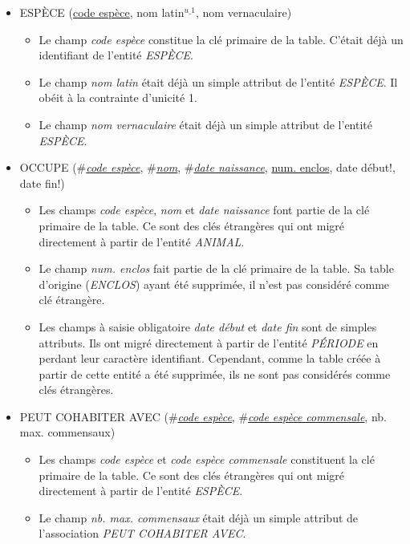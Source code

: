 \documentclass[a4paper]{article}
\newcommand{\relat}[1]{\textsc{#1}}
\newcommand{\attr}[1]{#1}
\newcommand{\prim}[1]{\uline{#1}}
\newcommand{\foreign}[1]{\#\textsl{#1}}
\begin{document}
\begin{itemize}
  \item \relat{ESPÈCE} (\prim{code espèce}, \attr{nom latin}$^{u\_1}$, \attr{nom vernaculaire})
  \begin{itemize}
    \item Le champ \emph{code espèce} constitue la clé primaire de la table. C'était déjà un identifiant de l'entité \emph{ESPÈCE}.
    \item Le champ \emph{nom latin} était déjà un simple attribut de l'entité \emph{ESPÈCE}. Il obéit à la contrainte d'unicité 1.
    \item Le champ \emph{nom vernaculaire} était déjà un simple attribut de l'entité \emph{ESPÈCE}.
  \end{itemize}

  \item \relat{OCCUPE} (\foreign{\prim{code espèce}}, \foreign{\prim{nom}}, \foreign{\prim{date naissance}}, \prim{num. enclos}, \attr{date début!}, \attr{date fin!})
  \begin{itemize}
    \item Les champs \emph{code espèce}, \emph{nom} et \emph{date naissance} font partie de la clé primaire de la table. Ce sont des clés étrangères qui ont migré directement à partir de l'entité \emph{ANIMAL}.
    \item Le champ \emph{num. enclos} fait partie de la clé primaire de la table. Sa table d'origine (\emph{ENCLOS}) ayant été supprimée, il n'est pas considéré comme clé étrangère.
    \item Les champs à saisie obligatoire \emph{date début} et \emph{date fin} sont de simples attributs. Ils ont migré directement à partir de l'entité \emph{PÉRIODE} en perdant leur caractère identifiant. Cependant, comme la table créée à partir de cette entité a été supprimée, ils ne sont pas considérés comme clés étrangères.
  \end{itemize}

  \item \relat{PEUT COHABITER AVEC} (\foreign{\prim{code espèce}}, \foreign{\prim{code espèce commensale}}, \attr{nb. max. commensaux})
  \begin{itemize}
    \item Les champs \emph{code espèce} et \emph{code espèce commensale} constituent la clé primaire de la table. Ce sont des clés étrangères qui ont migré directement à partir de l'entité \emph{ESPÈCE}.
    \item Le champ \emph{nb. max. commensaux} était déjà un simple attribut de l'association \emph{PEUT COHABITER AVEC}.
  \end{itemize}


\end{itemize}
\end{document}

